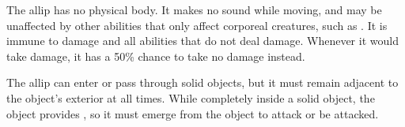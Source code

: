       The allip has no physical body.
      It makes no sound while moving, and may be unaffected by other abilities that only affect corporeal creatures, such as .
      It is immune to  damage and all  abilities that do not deal damage.
      Whenever it would take damage, it has a 50\% chance to take no damage instead.

      The allip can enter or pass through solid objects, but it must remain adjacent to the object's exterior at all times.
      While completely inside a solid object, the object provides , so it must emerge from the object to attack or be attacked.
  